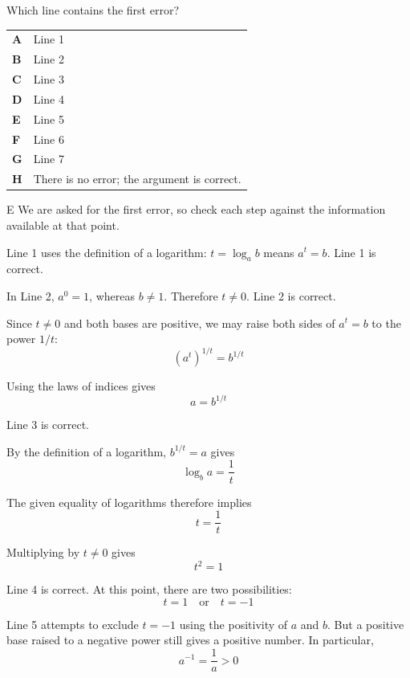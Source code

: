 \documentclass[11pt,a4paper]{article}
\begin{document}
\begin{enumerate}[label=\textbf{\arabic*.},leftmargin=*,itemsep=0pt,start=12]
Which line contains the first error?

\par\vspace*{12pt}
\begin{tabularx}{\linewidth}{@{}>{\bfseries}l Y@{}}
A &
Line 1
\\[0.8em]
B &
Line 2
\\[0.8em]
C &
Line 3
\\[0.8em]
D &
Line 4
\\[0.8em]
E &
Line 5
\\[0.8em]
F &
Line 6
\\[0.8em]
G &
Line 7
\\[0.8em]
H &
There is no error; the argument is correct.
\\
\end{tabularx}

\begin{djsSolution}{E}
We are asked for the first error, so check each step against the information available at that point.

Line 1 uses the definition of a logarithm: $t=\log_a b$ means $a^t=b$. Line 1 is correct.

In Line 2, $a^0=1$, whereas $b\ne1$. Therefore $t\ne0$. Line 2 is correct.

Since $t\ne0$ and both bases are positive, we may raise both sides of $a^t=b$ to the power $1/t$:
\[
(a^t)^{1/t}=b^{1/t}
\]

Using the laws of indices gives
\[
a=b^{1/t}
\]

Line 3 is correct.

By the definition of a logarithm, $b^{1/t}=a$ gives
\[
\log_b a=\frac1t
\]

The given equality of logarithms therefore implies
\[
t=\frac1t
\]

Multiplying by $t\ne0$ gives
\[
t^2=1
\]

Line 4 is correct. At this point, there are two possibilities:
\[
t=1\quad\text{or}\quad t=-1
\]

Line 5 attempts to exclude $t=-1$ using the positivity of $a$ and $b$. But a positive base raised to a negative power still gives a positive number. In particular,
\[
a^{-1}=\frac1a>0
\]


\end{djsSolution}
\end{enumerate}
\end{document}
